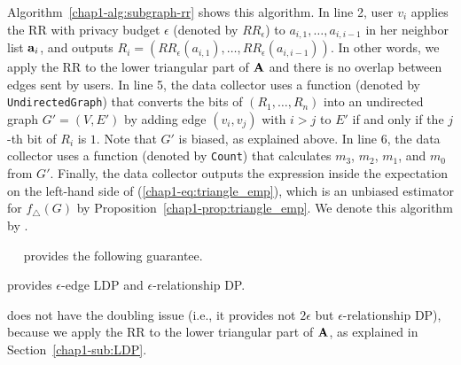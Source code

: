 Algorithm~\ref{chap1-alg:subgraph-rr} shows this algorithm. 
In line 2, user $v_i$ applies the RR with privacy budget $\epsilon$ (denoted by $RR_\epsilon$) to $a_{i,1}, \ldots, a_{i,i-1}$ 
in her neighbor list $\mathbf{a}_i$, and outputs $R_i = (RR_\epsilon(a_{i,1}), \ldots, RR_\epsilon(a_{i,i-1}))$. 
In other words, we apply the RR to the lower triangular part of $\mathbf{A}$ and there is no overlap between edges sent by users. 
In line 5, the data collector uses a function (denoted by \texttt{UndirectedGraph}) 
that converts the bits of $(R_1, \ldots, R_n)$ into an undirected graph $G'
= (V, E')$ by adding edge $(v_i,v_j)$ with $i>j$ to $E'$ if and only if the $j$-th bit of
$R_i$ is $1$. 
Note that $G'$ is biased, as explained above. 
In line 6, the data collector uses a function (denoted by 
\texttt{Count}) that calculates $m_3$, $m_2$, $m_1$, and $m_0$ from $G'$. 
Finally, the data collector outputs the expression inside the expectation on
the left-hand side of (\ref{chap1-eq:triangle_emp}), which is an unbiased estimator for 
$f_\triangle(G)$ by Proposition~\ref{chap1-prop:triangle_emp}.
We denote this algorithm by .



\smallskip
{}~~ 
provides the following guarantee.

\begin{theorem}\label{chap1-thm:subgraph-rr_LDP}
   provides $\epsilon$-edge LDP and $\epsilon$-relationship DP.
\end{theorem}

 does not have the doubling issue (i.e., it provides not $2\epsilon$ but $\epsilon$-relationship DP), because we apply the RR to the lower triangular part of $\mathbf{A}$, as explained in Section~\ref{chap1-sub:LDP}.

